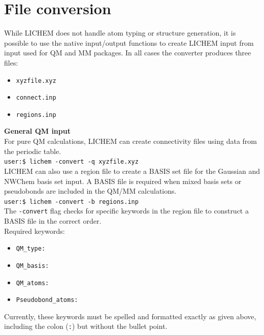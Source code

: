 \documentclass[12pt]{report}
\begin{document}
\section{File conversion}

While LICHEM does not handle atom typing or structure generation, it is
possible to use the native input/output functions to create LICHEM input from
input used for QM and MM packages.
In all cases the converter produces three files:
\begin{itemize}
\item \texttt{xyzfile.xyz} 
\item \texttt{connect.inp}
\item \texttt{regions.inp}\\
\end{itemize}

{\textbf{General QM input}} \\

For pure QM calculations, LICHEM can create connectivity files using data
from the periodic table. \\

\texttt{user:\$ lichem -convert -q xyzfile.xyz} \\

LICHEM can also use a region file to create a BASIS set file for the Gaussian
and NWChem basis set input.
A BASIS file is required when mixed basis sets or pseudobonds are included
in the QM/MM calculations. \\

\texttt{user:\$ lichem -convert -b regions.inp} \\

The \texttt{-convert} flag checks for specific keywords in the region file to
construct a BASIS file in the correct order. \\

Required keywords:
\begin{itemize}
\item \texttt{QM\_type:}
\item \texttt{QM\_basis:}
\item \texttt{QM\_atoms:}
\item \texttt{Pseudobond\_atoms:}\\
\end{itemize}

Currently, these keywords must be spelled and formatted exactly as given
above, including the colon (\texttt{:}) but without the bullet point. \\
\end{document}
